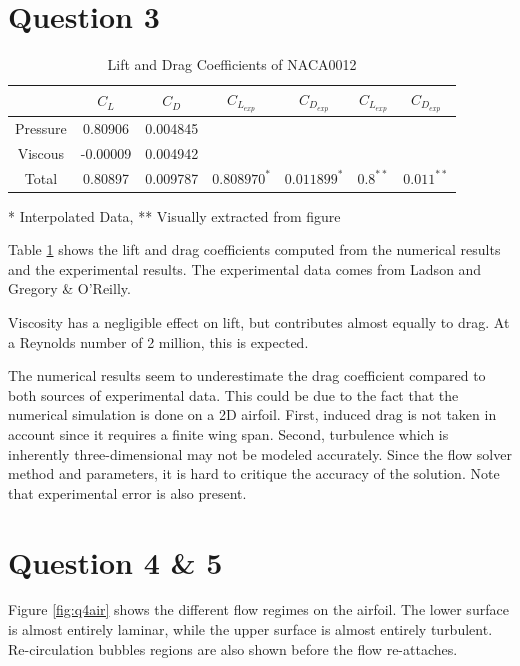 \documentclass[letterpaper,12pt,]{article}
\begin{document}
\section*{Question 3}
\begin{table}[!h]
\centering
\begin{tabular}{ccccccc} \toprule
    {} & {$C_L$} & {$C_D$} &
         {$C_{L_{exp}}$\cite{ladson}} & {$C_{D_{exp}}$\cite{ladson}} &
         {$C_{L_{exp}}$\cite{greg}} & {$C_{D_{exp}}$\cite{greg}}\\
         \midrule
    {Pressure}  &  0.80906  & 0.004845 &&&&\\
    {Viscous}   & -0.00009  & 0.004942 &&&&\\
    {Total}     &  0.80897  & 0.009787 & $0.808970^*$ & $0.011899^*$ &$0.8^{**}$&$0.011^{**}$\\
\bottomrule
\end{tabular}
\vspace{-0.5em}
\begin{flushleft}
{\tiny 
\hspace{5em}* Interpolated Data, ** Visually extracted from figure}
\end{flushleft}
\caption{Lift and Drag Coefficients of NACA0012}
\label{tab1}
\end{table}

Table \ref{tab1} shows the lift and drag coefficients computed from the numerical results and the experimental results.
The experimental data comes from Ladson\cite{ladson} and Gregory \& O'Reilly\cite{greg}.

Viscosity has a negligible effect on lift, but contributes almost equally to drag. At a Reynolds number of 2 million, this is expected.

The numerical results seem to underestimate the drag coefficient compared to both sources of experimental data.
This could be due to the fact that the numerical simulation is done on a 2D airfoil.
First, induced drag is not taken in account since it requires a finite wing span.
Second, turbulence which is inherently three-dimensional may not be modeled accurately.
Since the flow solver method and parameters, it is hard to critique the accuracy of the solution.
Note that experimental error is also present.

\section*{Question 4 \& 5}

Figure \ref{fig:q4air} shows the different flow regimes on the airfoil. The lower surface is almost entirely laminar, while the upper surface is almost entirely turbulent. Re-circulation bubbles regions are also shown before the flow re-attaches.
\end{document}
